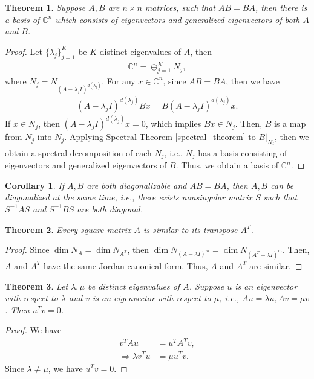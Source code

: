 \documentclass[11pt]{book}
\newtheorem{theorem}{Theorem}[chapter]
\newtheorem{corollary}{Corollary}[theorem]
\theoremstyle{definition}
\numberwithin{equation}{chapter}
\begin{document}
\medskip

\begin{theorem}{\rm \cite{18}}\label{commute_eigenspace}
Suppose $A, B$ are $n\times n$ matrices, such that $AB = BA$, then there is a basis of $\mathbb{C}^n$ which consists of eigenvectors and generalized eigenvectors of both $A$ and $B$.
\end{theorem}
\begin{proof}
Let $\{\lambda_j\}^K_{j=1}$ be $K$ distinct eigenvalues of $A$, then 
\begin{align*}
    \mathbb{C}^n = \oplus^K_{j=1} N_j,
\end{align*}
where $N_j = N_{(A - \lambda_j I)^{d(\lambda_j)}}$. For any $x\in\mathbb{C}^n$, since $AB = BA$, then we have
\begin{align*}
    (A - \lambda_j I)^{d(\lambda_j)} B x = B (A - \lambda_j I)^{d(\lambda_j)} x.
\end{align*}
If $x\in N_j$, then $ (A - \lambda_j I)^{d(\lambda_j)} x = 0$, which implies $Bx\in N_j$. Then, $B$ is a map from $N_j$ into $N_j$. Applying Spectral Theorem \ref{spectral_theorem} to $B|_{N_j}$, then we obtain a spectral decomposition of each $N_j$, i.e., $N_j$ has a basis consisting of eigenvectors and generalized eigenvectors of $B$. Thus, we obtain a basis of $\mathbb{C}^n$. 
\end{proof}

\begin{corollary}\label{diagonalized_same_time}{\rm \cite{43}}
If $A,B$ are both diagonalizable and $AB = BA$, then $A,B$ can be diagonalized at the same time, i.e., there exists nonsingular matrix $S$ such that $S^{-1}AS$ and $S^{-1}BS$ are both diagonal.
\end{corollary}

\medskip

\begin{theorem}
Every square matrix $A$ is similar to its transpose $A^T$.
\end{theorem}
\begin{proof}
Since $\dim N_A = \dim N_{A^T}$, then $\dim N_{(A-\lambda I)^m} = \dim N_{(A^T-\lambda I)^m}$. Then, $A$ and $A^T$ have the same Jordan canonical form. Thus, $A$ and $A^T$ are similar.
\end{proof}

\medskip

\begin{theorem}\label{eigenvector_transpose_theorem}
Let $\lambda, \mu$ be distinct eigenvalues of $A$. Suppose $u$ is an eigenvector with respect to $\lambda$ and $v$ is an eigenvector with respect to $\mu$, i.e., $Au = \lambda u, Av = \mu v$. Then $u^Tv = 0$.
\end{theorem}
\begin{proof}
We have 
\begin{align*}
    v^T A u & = u^T A^T v, \\
    \Rightarrow \lambda v^T u & = \mu u^T v.
\end{align*}
Since $\lambda \neq \mu$, we have $u^T v = 0$.
\end{proof}
\end{document}
